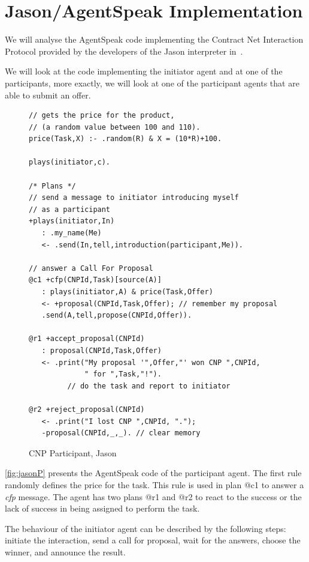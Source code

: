 \documentclass[a4paper,12pt,oneside,fleqn]{book} %
\begin{document}
\section{Jason/AgentSpeak Implementation} %
We will analyse the AgentSpeak code implementing the Contract Net
Interaction Protocol provided by the developers of the Jason interpreter
in~\cite{bordini2007programming}.

We will look at the code implementing the initiator agent and at one of the
participants, more exactly, we will look at one of the participant agents
that are able to submit an offer.

\begin{figure}\footnotesize %
\begin{verbatim}
// gets the price for the product,
// (a random value between 100 and 110).
price(Task,X) :- .random(R) & X = (10*R)+100.

plays(initiator,c).

/* Plans */
// send a message to initiator introducing myself
// as a participant
+plays(initiator,In)
   : .my_name(Me)
   <- .send(In,tell,introduction(participant,Me)).

// answer a Call For Proposal
@c1 +cfp(CNPId,Task)[source(A)]
   : plays(initiator,A) & price(Task,Offer)
   <- +proposal(CNPId,Task,Offer); // remember my proposal
   .send(A,tell,propose(CNPId,Offer)).

@r1 +accept_proposal(CNPId)
   : proposal(CNPId,Task,Offer)
   <- .print("My proposal '",Offer,"' won CNP ",CNPId,
             " for ",Task,"!").
         // do the task and report to initiator

@r2 +reject_proposal(CNPId)
   <- .print("I lost CNP ",CNPId, ".");
   -proposal(CNPId,_,_). // clear memory

\end{verbatim}
\caption{CNP Participant, Jason}
\label{fig:jasonP}
\end{figure} %

\autoref{fig:jasonP} presents the AgentSpeak code of the participant agent.
The first rule randomly defines the price for the task. This rule is used
in plan @c1 to answer a \textit{cfp} message. The agent has two plans @r1
and @r2 to react to the success or the lack of success in being assigned to
perform the task.


The behaviour of the initiator agent can be described by the following
steps: initiate the interaction, send a call for proposal, wait for the
answers, choose the winner, and announce the result. 
\end{document}
